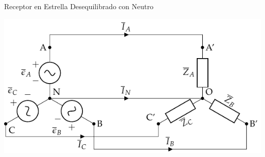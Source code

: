 \documentclass[aspectratio=169, usenames,svgnames,dvipsnames]{beamer}
\begin{document}
\begin{frame}[label={sec:org0f18cbe}]{Receptor en Estrella Desequilibrado con Neutro}
\begin{center}
\includegraphics[width=.9\linewidth]{../figs/EstrellaDesequilibrado.pdf}
\end{center}
\end{frame}
\end{document}
